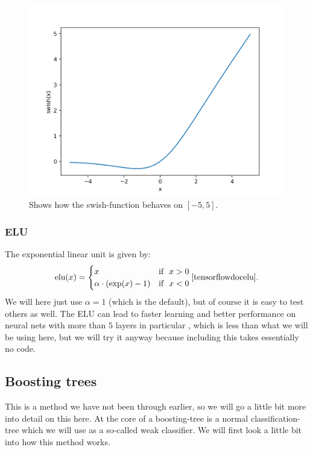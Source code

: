 \documentclass{article}
\begin{document}
\begin{figure}
	\centering
	\includegraphics[scale=0.8]{swish_plot}
	\caption{Shows how the swish-function behaves on $[-5, 5]$.}
	\label{swishillustration}
\end{figure}

\subsubsection{ELU}
The exponential linear unit is given by:
\[
	\text{elu}(x) = \begin{cases} x \qquad \qquad & \text{if}\ \ x > 0 \\ \alpha \cdot (\exp(x) - 1) & \text{if}\ \ x < 0 \end{cases} \cite{tensorflowdocelu}.
\]
We will here just use $\alpha = 1$ (which is the default), but of course it is
easy to test others as well. The ELU can lead to faster learning and better
performance on neural nets with more than $5$ layers in particular
\cite{clevert2016fast}, which is less than what we will be using here,
but we will try it anyway because including this takes essentially no code.

\subsection{Boosting trees}
This is a method we have not been through earlier, so we will go a little bit
more into detail on this here. At the core of a boosting-tree is a normal
classification-tree which we will use as a so-called weak classifier. We will
first look a little bit into how this method works.
\end{document}
